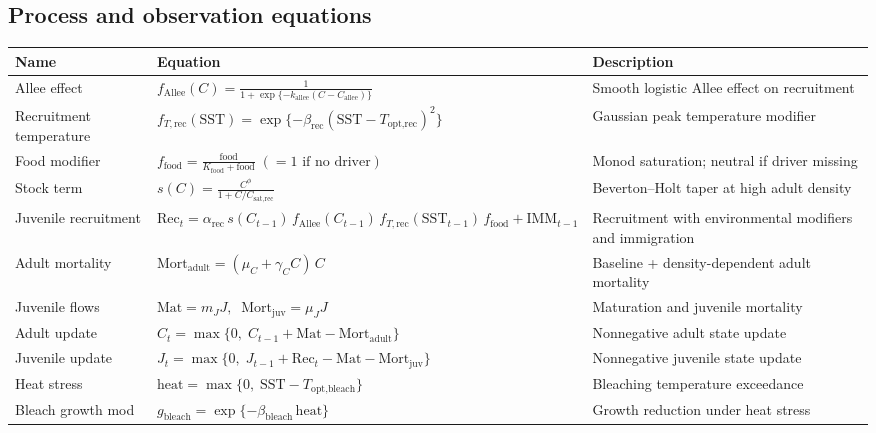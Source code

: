 \newpage
\begin{landscape}
\subsection*{Process and observation equations}

\begin{table}[ht]
  \centering
  \scriptsize
  \setlength{\tabcolsep}{4pt}
  \begin{tabularx}{1.0\linewidth}{l p{10cm} p{10cm}}
    \toprule
    Name & Equation & Description \\
    \midrule
Allee effect & $f_{\text{Allee}}(C)=\frac{1}{1+\exp\{-k_{\text{allee}}(C-C_{\text{allee}})\}}$ & Smooth logistic Allee effect on recruitment \\ 
Recruitment temperature & $f_{T,\text{rec}}(\mathrm{SST})=\exp\{-\beta_{\text{rec}}(\mathrm{SST}-T_{\text{opt,rec}})^2\}$ & Gaussian peak temperature modifier \\ 
Food modifier & $f_{\text{food}}=\frac{\text{food}}{K_{\text{food}}+\text{food}}\;(=1\text{ if no driver})$ & Monod saturation; neutral if driver missing \\ 
Stock term & $s(C)=\frac{C^{\phi}}{1+C/C_{\text{sat,rec}}}$ & Beverton--Holt taper at high adult density \\ 
Juvenile recruitment & $\mathrm{Rec}_{t}=\alpha_{\text{rec}}\,s(C_{t-1})\,f_{\text{Allee}}(C_{t-1})\,f_{T,\text{rec}}(\mathrm{SST}_{t-1})\,f_{\text{food}}+\mathrm{IMM}_{t-1}$ & Recruitment with environmental modifiers and immigration \\ 
Adult mortality & $\mathrm{Mort}_{\text{adult}}=(\mu_{C}+\gamma_{C}C)\,C$ & Baseline + density-dependent adult mortality \\ 
Juvenile flows & $\mathrm{Mat}=m_J J,\;\; \mathrm{Mort}_{\text{juv}}=\mu_J J$ & Maturation and juvenile mortality \\ 
Adult update & $C_t=\max\{0,\; C_{t-1}+\mathrm{Mat}-\mathrm{Mort}_{\text{adult}}\}$ & Nonnegative adult state update \\ 
Juvenile update & $J_t=\max\{0,\; J_{t-1}+\mathrm{Rec}_t-\mathrm{Mat}-\mathrm{Mort}_{\text{juv}}\}$ & Nonnegative juvenile state update \\ 
Heat stress & $\mathrm{heat}=\max\{0,\; \mathrm{SST}-T_{\text{opt,bleach}}\}$ & Bleaching temperature exceedance \\ 
Bleach growth mod & $g_{\text{bleach}}=\exp\{-\beta_{\text{bleach}}\,\mathrm{heat}\}$ & Growth reduction under heat stress \\ 

\end{tabularx}
\end{table}
\end{landscape}
